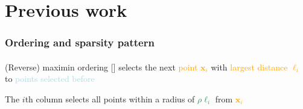 \documentclass{beamer}                             %
\renewcommand*{\vec}[1]{\bm{#1}}
\newenvironment{wideitemize}
  {\itemize\setlength{\itemsep}{0.5cm}}
  {\enditemize}
\begin{document}
\section{Previous work}

\begin{frame}
\frametitle{Ordering and sparsity pattern}
\framesubtitle{}

\begin{wideitemize}
  \item (Reverse) maximin ordering [\cite{guinness2018permutation}]
    selects the next \textcolor{orange}{point \( \vec{x}_i \)}
    with \textcolor{orange}{largest distance \( \ell_i \)} to
    \textcolor{lightblue}{points selected before}
  \item The \( i \)th column selects all points
    within a radius of \textcolor{seagreen}{\( \rho
    \ell_i \)} from \textcolor{orange}{\( \vec{x}_i \)}
\end{wideitemize}


\end{frame}
\end{document}

